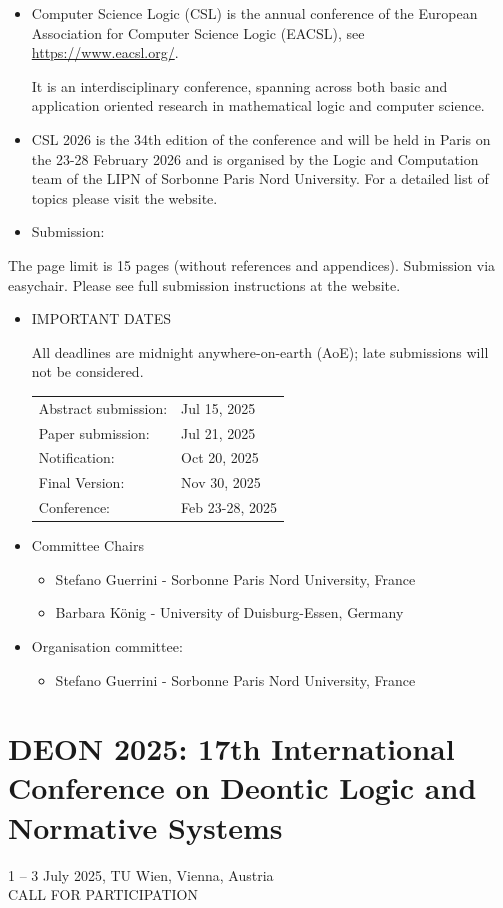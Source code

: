 \documentclass[prodmode,acmtecs]{acmsmall} %
\begin{document}
\begin{itemize}\item  Computer Science Logic (CSL) is the annual conference of the European Association for Computer Science Logic (EACSL), see \href{https://www.eacsl.org/}{https://www.eacsl.org/}. 
 
  It is an interdisciplinary conference, spanning across both basic and application oriented research in mathematical logic and computer science. 
 
\item  CSL 2026 is the 34th edition of the conference and will be held in Paris on the 23-28 February 2026 and is organised by the Logic and Computation team of the LIPN of Sorbonne Paris Nord University. For a detailed list of topics please visit the website.    
 
\item  Submission: 
 
\end{itemize}The page limit is 15  pages (without references and appendices). Submission via easychair. Please see full submission instructions at the website.  

\begin{itemize}\item  IMPORTANT DATES 
 
  All deadlines are midnight anywhere-on-earth (AoE); late submissions will not be considered. 
 
\begin{tabulary}{\linewidth}{LL}Abstract submission:  & Jul 15, 2025 \\
Paper submission:  & Jul 21, 2025 \\
Notification:  & Oct 20, 2025 \\
Final Version:  & Nov 30, 2025 \\
Conference:  & Feb 23-28, 2025 \\
\end{tabulary}
 
\item  Committee Chairs 
 
\begin{itemize}\item  Stefano Guerrini - Sorbonne Paris Nord University, France
\item  Barbara König - University of Duisburg-Essen, Germany
\end{itemize} 
\item  Organisation committee: 
 
\begin{itemize}\item  Stefano Guerrini - Sorbonne Paris Nord University, France
\end{itemize} 
\end{itemize}\section{DEON 2025: 17th International Conference on Deontic Logic and Normative Systems}\label{DEON2025}  1 – 3 July 2025, TU Wien, Vienna, Austria\\ 
CALL FOR PARTICIPATION 
\end{document}
